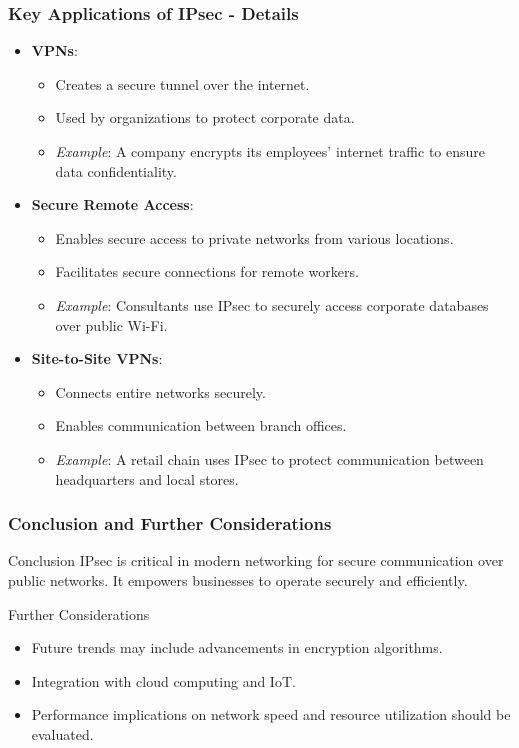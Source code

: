 \documentclass{beamer}
\begin{document}
\begin{frame}[fragile]
    \frametitle{Key Applications of IPsec - Details}
    \begin{itemize}
        \item \textbf{VPNs}:
        \begin{itemize}
            \item Creates a secure tunnel over the internet.
            \item Used by organizations to protect corporate data.
            \item \textit{Example}: A company encrypts its employees' internet traffic to ensure data confidentiality.
        \end{itemize}
        
        \item \textbf{Secure Remote Access}:
        \begin{itemize}
            \item Enables secure access to private networks from various locations.
            \item Facilitates secure connections for remote workers.
            \item \textit{Example}: Consultants use IPsec to securely access corporate databases over public Wi-Fi.
        \end{itemize}

        \item \textbf{Site-to-Site VPNs}:
        \begin{itemize}
            \item Connects entire networks securely.
            \item Enables communication between branch offices.
            \item \textit{Example}: A retail chain uses IPsec to protect communication between headquarters and local stores.
        \end{itemize}
    \end{itemize}
\end{frame}

\begin{frame}[fragile]
    \frametitle{Conclusion and Further Considerations}
    \begin{block}{Conclusion}
        IPsec is critical in modern networking for secure communication over public networks.
        It empowers businesses to operate securely and efficiently.
    \end{block}

    \begin{block}{Further Considerations}
        \begin{itemize}
            \item Future trends may include advancements in encryption algorithms.
            \item Integration with cloud computing and IoT.
            \item Performance implications on network speed and resource utilization should be evaluated.
        \end{itemize}
    \end{block}
\end{frame}
\end{document}
